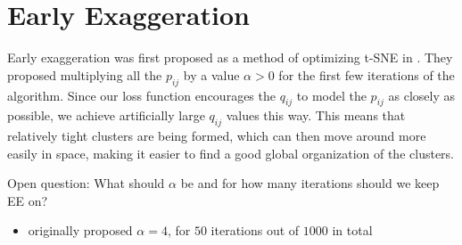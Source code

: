 \section{Early Exaggeration}
Early exaggeration was first proposed as a method of optimizing t-SNE in \cite{vdMaa08}. They proposed multiplying all the $p_{ij}$ by a value $\alpha > 0$ for the first few iterations of the algorithm. Since our loss function encourages the $q_{ij}$ to model the $p_{ij}$ as closely as possible, we achieve artificially large $q_{ij}$ values this way. This means that relatively tight clusters are being formed, which can then move around more easily in space, making it easier to find a good global organization of the clusters. 

Open question: What should $\alpha$ be and for how many iterations should we keep EE on? 
\begin{itemize}
    \item \cite{vdMaa08} originally proposed $\alpha = 4$, for $50$ iterations out of $1000$ in total 
\end{itemize}